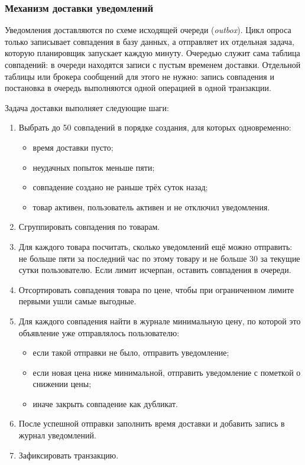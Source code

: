 \subsubsection{Механизм доставки уведомлений}

Уведомления доставляются по схеме исходящей очереди (\textit{outbox}). Цикл опроса только записывает совпадения в базу данных, а отправляет их отдельная задача, которую планировщик запускает каждую минуту. Очередью служит сама таблица совпадений: в очереди находятся записи с пустым временем доставки. Отдельной таблицы или брокера сообщений для этого не нужно: запись совпадения и постановка в очередь выполняются одной операцией в одной транзакции.

Задача доставки выполняет следующие шаги:
\begin{enumerate}
	\item Выбрать до 50 совпадений в порядке создания, для которых одновременно:
	\begin{itemize}[itemindent=2.2ex,leftmargin=2\parindent,label=--]
		\item время доставки пусто;
		\item неудачных попыток меньше пяти;
		\item совпадение создано не раньше трёх суток назад;
		\item товар активен, пользователь активен и не отключил уведомления.
	\end{itemize}
	\item Сгруппировать совпадения по товарам.
	\item Для каждого товара посчитать, сколько уведомлений ещё можно отправить: не больше пяти за последний час по этому товару и не больше 30 за текущие сутки пользователю. Если лимит исчерпан, оставить совпадения в очереди.
	\item Отсортировать совпадения товара по цене, чтобы при ограниченном лимите первыми ушли самые выгодные.
	\item Для каждого совпадения найти в журнале минимальную цену, по которой это объявление уже отправлялось пользователю:
	\begin{itemize}[itemindent=2.2ex,leftmargin=2\parindent,label=--]
		\item если такой отправки не было, отправить уведомление;
		\item если новая цена ниже минимальной, отправить уведомление с пометкой о снижении цены;
		\item иначе закрыть совпадение как дубликат.
	\end{itemize}
	\item После успешной отправки заполнить время доставки и добавить запись в журнал уведомлений.
	\item Зафиксировать транзакцию.
\end{enumerate}

